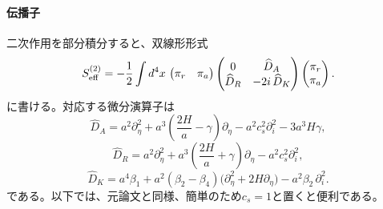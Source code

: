 \documentclass[a4paper,11pt,oneside]{article}
\theoremstyle{definition}
\numberwithin{equation}{section}
\begin{document}
\paragraph{伝播子} 二次作用を部分積分すると、双線形形式
\begin{equation}
S_{\rm eff}^{(2)}
=
-\frac12
\int d^4x\,
\begin{pmatrix}
\pi_r & \pi_a
\end{pmatrix}
\begin{pmatrix}
0 & \widehat D_A \\
\widehat D_R & -2i\,\widehat D_K
\end{pmatrix}
\begin{pmatrix}
\pi_r \\
\pi_a
\end{pmatrix} .
\end{equation}
に書ける。対応する微分演算子は
\begin{equation}
\widehat D_A
=
a^2\partial_\eta^2
+
a^3\left(\frac{2H}{a}-\gamma\right)\partial_\eta
-
a^2 c_s^2 \partial_i^2
-
3a^3H\gamma ,
\end{equation}
\begin{equation}
\widehat D_R
=
a^2\partial_\eta^2
+
a^3\left(\frac{2H}{a}+\gamma\right)\partial_\eta
-
a^2 c_s^2 \partial_i^2 ,
\end{equation}
\begin{equation}
\widehat D_K
=
a^4\beta_1
+
a^2(\beta_2-\beta_4)\bigl(\partial_\eta^2+2H\partial_\eta\bigr)
-
a^2\beta_2\,\partial_i^2 .
\end{equation}
である。以下では、元論文と同様、簡単のため\(c_s=1\)と置くと便利である。
\end{document}
